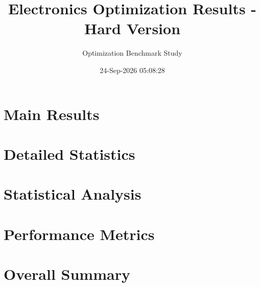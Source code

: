 \documentclass[12pt,a4paper]{article}
\begin{document}
\title{Electronics Optimization Results - Hard Version}
\author{Optimization Benchmark Study}
\date{24-Sep-2026 05:08:28}
\maketitle

\section{Main Results}



\section{Detailed Statistics}











\section{Statistical Analysis}







\section{Performance Metrics}





\section{Overall Summary}


\end{document}
